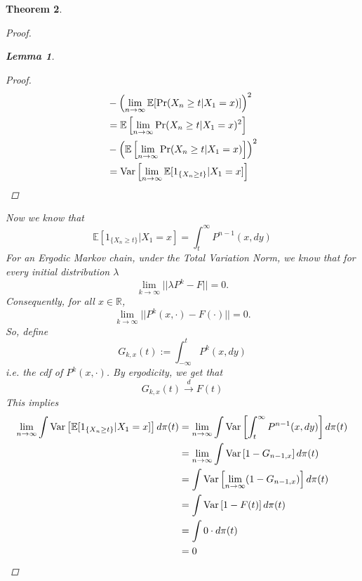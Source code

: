 \documentclass{article}
\newtheorem{theorem}{Theorem}[section]
\newtheorem{lemma}[theorem]{Lemma}
\begin{document}
\begin{theorem}
\begin{proof}
\begin{lemma}
\begin{proof}
\begin{align*}
						&- \left(\lim_{n \rightarrow \infty} \mathbb{E}[\Pr(X_{n} \geq t | X_{1} = x)]\right)^2\\
						&= \mathbb{E}\left[\lim_{n \rightarrow \infty} \Pr(X_{n} \geq t | X_{1} = x)^2\right]\\
						&- \left(\mathbb{E}\left[\lim_{n \rightarrow \infty}\Pr(X_{n} \geq t | X_{1} = x)\right]\right)^2\\
						&= \text{Var}\left[\lim_{n \rightarrow \infty} \mathbb{E}[1_{\{X_{n} \geq t\}}|X_1=x]\right]
					\end{align*}
				\end{proof}
			\end{lemma}
			Now we know that
			\begin{equation*}
				\mathbb{E}[1_{\{X_{n} \geq t\}}|X_1=x] = \int_t^{\infty} P^{n-1}(x, dy)
			\end{equation*}
			For an Ergodic Markov chain, under the Total Variation Norm, we know that for every initial distribution $\lambda$
			\begin{equation*}
				\lim_{k\rightarrow\infty}||\lambda P^k - F|| = 0.
			\end{equation*}
			Consequently, for all $x \in \mathbb{R}$,
			\begin{equation*}
				\lim_{k\rightarrow\infty}||P^k(x, \cdot) - F(\cdot)|| = 0.
			\end{equation*}
			So, define $$G_{k, x}(t) := \int_{-\infty}^{t} P^{k}(x, dy)$$
			i.e. the cdf of $P^k(x, \cdot)$. By ergodicity, we get that
			$$G_{k, x}(t) \xrightarrow{d} F(t)$$
			This implies
			\begin{align*}
				\lim_{n \rightarrow \infty} \int \text{Var}\left[\mathbb{E}[1_{\{X_{n} \geq t\}}|X_1=x]\right] d\pi(t) &= \lim_{n \rightarrow \infty} \int \text{Var}\left[\int_t^{\infty} P^{n-1}(x, dy)\right] d\pi(t)\\
				&= \lim_{n \rightarrow \infty} \int \text{Var}\left[1-G_{n-1, x}\right] d\pi(t)\\
				&= \int \text{Var}\left[\lim_{n \rightarrow \infty}(1-G_{n-1, x})\right] d\pi(t)\\
				&= \int \text{Var}\left[1-F(t)\right] d\pi(t)\\
				&= \int 0 \cdot d\pi(t)\\
				&= 0
			\end{align*}
		\end{proof}
	\end{theorem}
\end{document}
